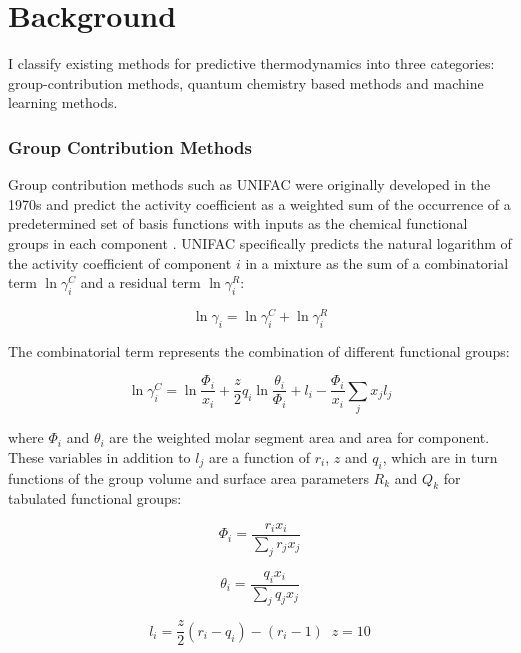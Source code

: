 \section{Background}

I classify existing methods for predictive thermodynamics into three categories: group-contribution methods, quantum chemistry based methods and machine learning methods. 

\subsubsection{Group Contribution Methods}

Group contribution methods such as UNIFAC were originally developed in the 1970s and predict the activity coefficient as a weighted sum of the occurrence of a predetermined set of basis functions with inputs as the chemical functional groups in each component \cite{Fredenslund1975}. UNIFAC specifically predicts the natural logarithm of the activity coefficient of component $i$ in  a mixture as the sum of a combinatorial term $\ln \gamma_i^C$ and a residual term $\ln \gamma_i^R$:

\begin{equation}
    \ln \gamma_i = \ln \gamma_i^C + \ln \gamma_i^R
\end{equation}

The combinatorial term represents the combination of different functional groups:

\begin{equation}
    \ln  \gamma^C_i = \ln \frac{\Phi_i}{x_i} + \frac{z}{2} q_i \ln \frac{\theta_i}{\Phi_i} + l_i - \frac{\Phi_i}{x_i} \sum_jx_jl_j
\end{equation}

where $\Phi_i$ and $\theta_i$ are the weighted molar segment area and area for component. These variables in addition to $l_j$ are a function of $r_i$, $z$ and $q_i$, which are  in turn functions of the group volume and surface area parameters $R_k$ and $Q_k$ for tabulated functional groups:

\begin{equation}
    \Phi_i  = \frac{r_i x_i}{\sum_j r_j x_j}
\end{equation}

\begin{equation}
    \theta_i = \frac{q_i x_i}{\sum_j q_j x_j}
\end{equation}

\begin{equation}
    l_i = \frac{z}{2}(r_i-q_i) - (r_i -1) \;\; z=10
\end{equation}


